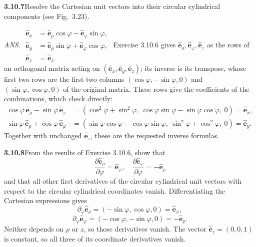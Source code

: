 \par\bigskip
\noindent\textbf{3.10.7}\quad Resolve the Cartesian unit vectors into their
circular cylindrical components (see Fig.~3.23).
\par\nobreak\hfill\emph{ANS.}\enspace
$\begin{aligned}
\hat{\mathbf{e}}_{x}&=\hat{\mathbf{e}}_{\rho}\cos\varphi
-\hat{\mathbf{e}}_{\varphi}\sin\varphi,\\
\hat{\mathbf{e}}_{y}&=\hat{\mathbf{e}}_{\rho}\sin\varphi
+\hat{\mathbf{e}}_{\varphi}\cos\varphi,\\
\hat{\mathbf{e}}_{z}&=\hat{\mathbf{e}}_{z}.
\end{aligned}$
\solution
Exercise 3.10.6 gives $\hat{\mathbf e}_\rho,\hat{\mathbf e}_\varphi,
\hat{\mathbf e}_z$ as the rows of an orthogonal matrix acting on
$(\hat{\mathbf e}_x,\hat{\mathbf e}_y,\hat{\mathbf e}_z)$; its inverse is
its transpose, whose first two rows are the first two columns
$(\cos\varphi,-\sin\varphi,0)$ and $(\sin\varphi,\cos\varphi,0)$ of
the original matrix. These rows give the coefficients of the
combinations, which check directly:
\[
\begin{aligned}
\cos\varphi\,\hat{\mathbf e}_\rho-\sin\varphi\,\hat{\mathbf e}_\varphi
&=(\cos^2\varphi+\sin^2\varphi,\ \cos\varphi\sin\varphi
-\sin\varphi\cos\varphi,\ 0)=\hat{\mathbf e}_x,\\
\sin\varphi\,\hat{\mathbf e}_\rho+\cos\varphi\,\hat{\mathbf e}_\varphi
&=(\sin\varphi\cos\varphi-\cos\varphi\sin\varphi,\
\sin^2\varphi+\cos^2\varphi,\ 0)=\hat{\mathbf e}_y.
\end{aligned}
\]
Together with unchanged $\hat{\mathbf e}_z$, these are the requested
inverse formulas.

\par\bigskip
\noindent\textbf{3.10.8}\quad From the results of Exercise 3.10.6, show that
\[
\frac{\partial\hat{\mathbf{e}}_{\rho}}{\partial\varphi}
=\hat{\mathbf{e}}_{\varphi},\quad
\frac{\partial\hat{\mathbf{e}}_{\varphi}}{\partial\varphi}
=-\hat{\mathbf{e}}_{\rho}
\]
and that all other first derivatives of the circular cylindrical unit vectors
with respect to the circular cylindrical coordinates vanish.
\solution
Differentiating the Cartesian expressions gives
\[
\partial_\varphi\hat{\mathbf e}_\rho
=(-\sin\varphi,\cos\varphi,0)=\hat{\mathbf e}_\varphi,
\]
\[
\partial_\varphi\hat{\mathbf e}_\varphi
=(-\cos\varphi,-\sin\varphi,0)=-\hat{\mathbf e}_\rho.
\]
Neither depends on $\rho$ or $z$, so those derivatives vanish.
The vector $\hat{\mathbf e}_z=(0,0,1)$ is constant, so all three
of its coordinate derivatives vanish.

